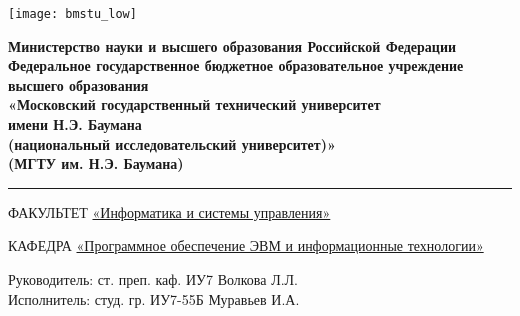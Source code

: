 \documentclass[../report.tex]{subfiles}
\begin{document}
\thispagestyle{empty}
\doublespacing
\noindent
\begin{minipage}[l]{0.15\textwidth}
	\centering
	\texttt{[image: bmstu\_low]}
\end{minipage}
\begin{minipage}[r]{0.85\textwidth}
	\centering\bfseries\singlespacing
	Министерство науки и высшего образования Российской Федерации\\
Федеральное государственное бюджетное образовательное учреждение\\
высшего образования\\
«Московский государственный технический университет\\
имени Н.Э. Баумана\\
(национальный исследовательский университет)»\\
(МГТУ им. Н.Э. Баумана)
\end{minipage}

\vspace*{5mm}
\noindent
\rule{\textwidth}{3pt}

\noindent
\MakeUppercase{Факультет}
\underline{«Информатика и системы управления»}

\noindent
\MakeUppercase{Кафедра}
\underline{«Программное обеспечение ЭВМ и информационные технологии»}

\vspace*{4cm}

\noindent
{}

\vspace*{3cm}

\begin{FlushLeft}
Руководитель: ст. преп. каф. ИУ7 \noindent\underline{\makebox[3em][l]{}} Волкова Л.Л.\\
Исполнитель: студ. гр. ИУ7-55Б \noindent\underline{\makebox[3em][l]{}} Муравьев И.А.
\end{FlushLeft}

\vspace*{\fill}
\end{document}
